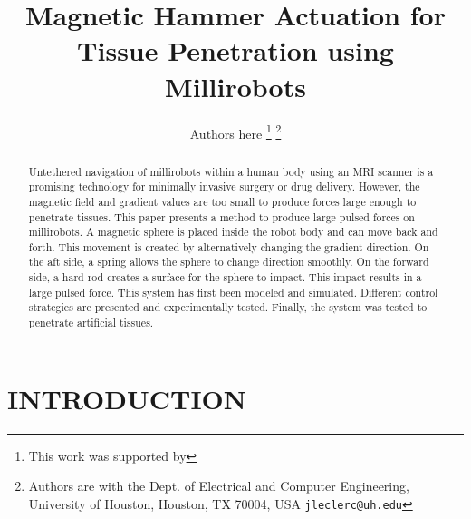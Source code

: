 \documentclass[letterpaper, 10 pt, conference]{ieeeconf}  %
\title{\LARGE \bf
Magnetic Hammer Actuation for Tissue Penetration using Millirobots
}
\author{Authors here%
\thanks{This work was supported by }%
\thanks{Authors are with the Dept. of Electrical and Computer
Engineering, University of Houston, Houston, TX 70004, USA
        {\tt\small jleclerc@uh.edu}}%
}
\begin{document}
\maketitle
\thispagestyle{empty}
\pagestyle{empty}


\begin{abstract}

Untethered navigation of millirobots within a human body using an MRI scanner is a promising technology for minimally invasive surgery or drug delivery. However, the magnetic field and gradient values are too small to produce forces large enough to penetrate tissues. This paper presents a method to produce large pulsed forces on millirobots. A magnetic sphere is placed inside the robot body and can move back and forth. This movement is created by alternatively changing the gradient direction. On the aft side, a spring allows the sphere to change direction smoothly. On the forward side, a hard rod creates a surface for the sphere to impact. This impact results in a large pulsed force. This system has first been modeled and simulated. Different control strategies are presented and experimentally tested. Finally, the system was tested to penetrate artificial tissues. 

\end{abstract}


\section{INTRODUCTION}
\end{document}
